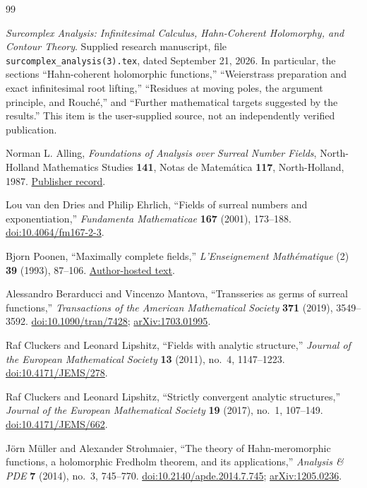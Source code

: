 \documentclass[11pt,oneside]{article}
\numberwithin{equation}{section}
\theoremstyle{definition}
\theoremstyle{remark}\newtheorem{remark}[theorem]{Remark}
\begin{document}
\begin{thebibliography}{99}
\small
{}

\emph{Surcomplex Analysis: Infinitesimal Calculus, Hahn-Coherent Holomorphy, and Contour Theory}.
Supplied research manuscript, file \texttt{surcomplex\_analysis(3).tex}, dated September 21, 2026.
In particular, the sections ``Hahn-coherent holomorphic functions,'' ``Weierstrass preparation and exact infinitesimal root lifting,'' ``Residues at moving poles, the argument principle, and Rouch\'e,'' and ``Further mathematical targets suggested by the results.''
This item is the user-supplied source, not an independently verified publication.

Norman L. Alling,
\emph{Foundations of Analysis over Surreal Number Fields},
North-Holland Mathematics Studies \textbf{141}, Notas de Matem\'atica \textbf{117}, North-Holland, 1987.
\href{https://shop.elsevier.com/books/foundations-of-analysis-over-surreal-number-fields/alling/978-0-444-70226-5}{Publisher record}.

Lou van den Dries and Philip Ehrlich,
``Fields of surreal numbers and exponentiation,''
\emph{Fundamenta Mathematicae} \textbf{167} (2001), 173--188.
\href{https://doi.org/10.4064/fm167-2-3}{doi:10.4064/fm167-2-3}.

Bjorn Poonen,
``Maximally complete fields,''
\emph{L'Enseignement Math\'ematique} (2) \textbf{39} (1993), 87--106.
\href{https://math.mit.edu/~poonen/papers/amsval.pdf}{Author-hosted text}.

Alessandro Berarducci and Vincenzo Mantova,
``Transseries as germs of surreal functions,''
\emph{Transactions of the American Mathematical Society} \textbf{371} (2019), 3549--3592.
\href{https://doi.org/10.1090/tran/7428}{doi:10.1090/tran/7428};
\href{https://arxiv.org/abs/1703.01995}{arXiv:1703.01995}.

Raf Cluckers and Leonard Lipshitz,
``Fields with analytic structure,''
\emph{Journal of the European Mathematical Society} \textbf{13} (2011), no.~4, 1147--1223.
\href{https://doi.org/10.4171/JEMS/278}{doi:10.4171/JEMS/278}.

Raf Cluckers and Leonard Lipshitz,
``Strictly convergent analytic structures,''
\emph{Journal of the European Mathematical Society} \textbf{19} (2017), no.~1, 107--149.
\href{https://doi.org/10.4171/JEMS/662}{doi:10.4171/JEMS/662}.

J\"orn M\"uller and Alexander Strohmaier,
``The theory of Hahn-meromorphic functions, a holomorphic Fredholm theorem, and its applications,''
\emph{Analysis \& PDE} \textbf{7} (2014), no.~3, 745--770.
\href{https://doi.org/10.2140/apde.2014.7.745}{doi:10.2140/apde.2014.7.745};
\href{https://arxiv.org/abs/1205.0236}{arXiv:1205.0236}.


\end{thebibliography}
\end{document}
